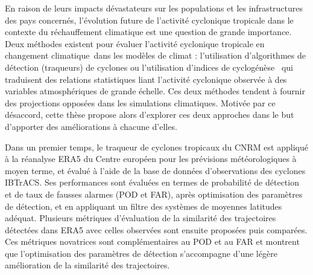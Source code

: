 \documentclass[12pt,twoside,openright]{book}
\begin{document}
En raison de leurs impacts dévastateurs sur les populations et les infrastructures des pays concernés, l'évolution future de l'activité cyclonique tropicale
dans le contexte du réchauffement climatique est une question de grande importance. Deux méthodes existent pour évaluer l'activité cyclonique tropicale en
changement climatique dans les modèles de climat : l'utilisation d’algorithmes de détection (traqueurs) de cyclones ou l'utilisation d’indices de cyclogénèse 
qui traduisent des relations statistiques liant l'activité cyclonique observée à des variables atmosphériques de grande échelle. Ces deux méthodes tendent à
fournir des projections opposées dans les simulations climatiques. Motivée par ce désaccord, cette thèse propose alors d’explorer ces deux approches dans le but
d’apporter des améliorations à chacune d’elles.

Dans un premier temps, le traqueur de cyclones tropicaux du CNRM est appliqué à la réanalyse ERA5 du Centre européen pour les prévisions météorologiques à moyen
terme, et évalué à l'aide de la base de données d’observations des cyclones IBTrACS. Ses performances sont évaluées en termes de probabilité de détection et de
taux de fausses alarmes (POD et FAR), après optimisation des paramètres de détection, et en appliquant un filtre des systèmes de moyennes latitudes adéquat.
Plusieurs métriques d’évaluation de la similarité des trajectoires détectées dans ERA5 avec celles observées sont ensuite proposées puis comparées. Ces
métriques novatrices sont complémentaires au POD et au FAR et montrent que l'optimisation des paramètres de détection s’accompagne d’une légère amélioration de
la similarité des trajectoires.
\end{document}
